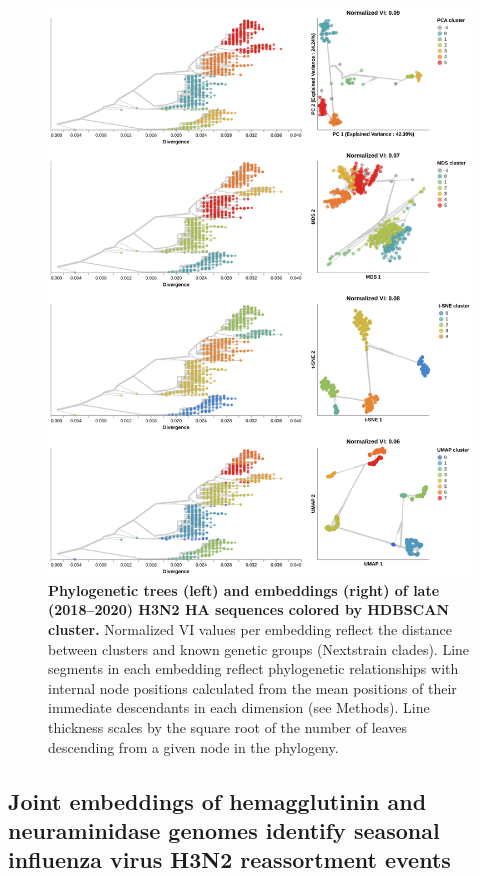\documentclass[10pt,letterpaper]{article}
\begin{document}
\begin{figure}[!h]
\includegraphics[width=\columnwidth]{figures/flu-2018-2020-ha-embeddings-by-cluster.png}
\caption{{\bf Phylogenetic trees (left) and embeddings (right) of late (2018--2020) H3N2 HA sequences colored by HDBSCAN cluster.}
  Normalized VI values per embedding reflect the distance between clusters and known genetic groups (Nextstrain clades).
  Line segments in each embedding reflect phylogenetic relationships with internal node positions calculated from the mean positions of their immediate descendants in each dimension (see Methods).
  Line thickness scales by the square root of the number of leaves descending from a given node in the phylogeny.}
\label{fig:seasonal-influenza-h3n2-ha-2018-2020-clusters}
\end{figure}

\subsection*{Joint embeddings of hemagglutinin and neuraminidase genomes identify seasonal influenza virus H3N2 reassortment events}
\end{document}
